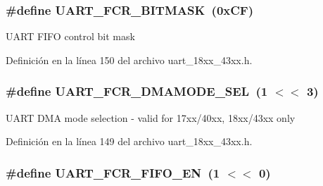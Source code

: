 \subsubsection[{\texorpdfstring{U\+A\+R\+T\+\_\+\+F\+C\+R\+\_\+\+B\+I\+T\+M\+A\+SK}{UART_FCR_BITMASK}}]{\setlength{\rightskip}{0pt plus 5cm}\#define U\+A\+R\+T\+\_\+\+F\+C\+R\+\_\+\+B\+I\+T\+M\+A\+SK~(0x\+C\+F)}\hypertarget{group___u_a_r_t__18_x_x__43_x_x_ga2dd6b12c7c237b0a52c6a82698f85b04}{}\label{group___u_a_r_t__18_x_x__43_x_x_ga2dd6b12c7c237b0a52c6a82698f85b04}
U\+A\+RT F\+I\+FO control bit mask 

Definición en la línea 150 del archivo uart\+\_\+18xx\+\_\+43xx.\+h.

\subsubsection[{\texorpdfstring{U\+A\+R\+T\+\_\+\+F\+C\+R\+\_\+\+D\+M\+A\+M\+O\+D\+E\+\_\+\+S\+EL}{UART_FCR_DMAMODE_SEL}}]{\setlength{\rightskip}{0pt plus 5cm}\#define U\+A\+R\+T\+\_\+\+F\+C\+R\+\_\+\+D\+M\+A\+M\+O\+D\+E\+\_\+\+S\+EL~(1 $<$$<$ 3)}\hypertarget{group___u_a_r_t__18_x_x__43_x_x_ga996e144f7d08cb36aa729f28d74b5801}{}\label{group___u_a_r_t__18_x_x__43_x_x_ga996e144f7d08cb36aa729f28d74b5801}
U\+A\+RT D\+MA mode selection -\/ valid for 17xx/40xx, 18xx/43xx only 

Definición en la línea 149 del archivo uart\+\_\+18xx\+\_\+43xx.\+h.

\subsubsection[{\texorpdfstring{U\+A\+R\+T\+\_\+\+F\+C\+R\+\_\+\+F\+I\+F\+O\+\_\+\+EN}{UART_FCR_FIFO_EN}}]{\setlength{\rightskip}{0pt plus 5cm}\#define U\+A\+R\+T\+\_\+\+F\+C\+R\+\_\+\+F\+I\+F\+O\+\_\+\+EN~(1 $<$$<$ 0)}\hypertarget{group___u_a_r_t__18_x_x__43_x_x_gadec12ecfc7ae1198cee68f2cad982bcb}{}\label{group___u_a_r_t__18_x_x__43_x_x_gadec12ecfc7ae1198cee68f2cad982bcb}


